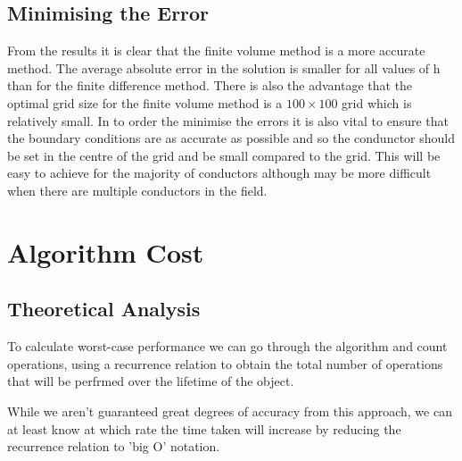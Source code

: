 \documentclass[aps,twocolumn,pre,nofootinbib,10pt]{revtex4-1}
\begin{document}
\subsection{Minimising the Error}

From the results it is clear that the finite volume method is a more accurate method. The average absolute error in the solution is smaller for all values of h than for the finite difference method. There is also the advantage that the optimal grid size for the finite volume method is a $100 \times 100$ grid which is relatively small.
In to order the minimise the errors it is also vital to ensure that the boundary conditions are as accurate as possible and so the condunctor should be set in the centre of the grid and be small compared to the grid. This will be easy to achieve for the majority of conductors although may be more difficult when there are multiple conductors in the field.

\section{Algorithm Cost}
\subsection{Theoretical Analysis}

To calculate worst-case performance we can go through the algorithm and count operations, using a recurrence relation to obtain the total number of operations that will be perfrmed over the lifetime of the object.

While we aren't guaranteed great degrees of accuracy from this approach, we can at least know at which rate the time taken will increase by reducing the recurrence relation to 'big O' notation.
\end{document}
